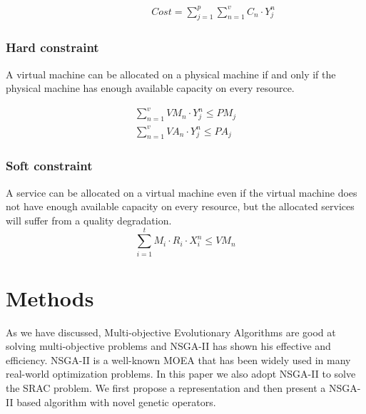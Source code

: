 \begin{equation}
\label{eq:cost}
\begin{aligned}
& & & & & & & Cost = \sum\limits_{j=1}^p\sum\limits_{n=1}^v C_n \cdot Y^n_j
\end{aligned}
\end{equation}

\subsubsection{Hard constraint}
A virtual machine can be allocated on a physical machine if and 
only if the physical machine has enough available capacity on every resource.

\begin{equation} 
\label{eq:constraint}
\begin{aligned}
\sum\limits_{n=1}^v VM_n \cdot Y^n_j \leq PM_j\\
\sum\limits_{n=1}^v VA_n \cdot Y^n_j \leq PA_j
\end{aligned}
\end{equation}

\subsubsection{Soft constraint}
A service can be allocated on a virtual machine even if the 
virtual machine does not have enough available capacity on every resource, but the allocated services will suffer from a quality 
degradation.
\begin{equation}
\sum\limits_{i=1}^t M_i \cdot R_i \cdot X_i^n  \leq VM_n
\end{equation}

\section{Methods}
\label{sec:method}
As we have discussed, Multi-objective Evolutionary Algorithms are good at solving 
multi-objective problems and NSGA-II \cite{nsgaii} has shown his effective and efficiency. NSGA-II is a well-known MOEA that has been widely used
in many real-world optimization problems. 
In this paper we also adopt NSGA-II to solve the SRAC problem. 
We first propose a representation and then present a NSGA-II based algorithm with novel genetic operators.

